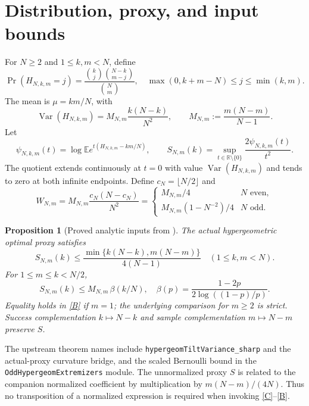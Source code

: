 \documentclass[11pt]{article}
\numberwithin{equation}{section}
\newtheorem{proposition}[theorem]{Proposition}
\theoremstyle{remark}\newtheorem{remark}[theorem]{Remark}
\newcommand{\E}{\mathbb E}
\newcommand{\Var}{\operatorname{Var}}
\begin{document}
\section{Distribution, proxy, and input bounds}
For $N\ge2$ and $1\le k,m<N$, define
\begin{equation}\label{pmf}
\Pr(H_{N,k,m}=j)=
 \frac{\binom{k}{j}\binom{N-k}{m-j}}{\binom{N}{m}},
 \quad \max(0,k+m-N)\le j\le\min(k,m).
\end{equation}
The mean is $\mu=km/N$, with
\begin{equation}\label{variance}
\Var(H_{N,k,m})=
M_{N,m}\frac{k(N-k)}{N^2},\qquad
M_{N,m}:=\frac{m(N-m)}{N-1}.
\end{equation}
Let
\begin{equation}\label{proxy}
\psi_{N,k,m}(t)=\log\E e^{t(H_{N,k,m}-km/N)},\qquad
S_{N,m}(k)=\sup_{t\in\mathbb R\setminus\{0\}}
 \frac{2\psi_{N,k,m}(t)}{t^2}.
\end{equation}
The quotient extends continuously at $t=0$ with value
$\Var(H_{N,k,m})$ and tends to zero at both infinite endpoints.
Define $c_N=\lfloor N/2\rfloor$ and
\begin{equation}\label{W}
W_{N,m}=M_{N,m}\frac{c_N(N-c_N)}{N^2}
=\begin{cases}M_{N,m}/4&N\text{ even},\\
 M_{N,m}(1-N^{-2})/4&N\text{ odd}.
\end{cases}
\end{equation}

\begin{proposition}[Proved analytic inputs from \cite{Wang}]\label{inputs}
The actual hypergeometric optimal proxy satisfies
\begin{equation}\label{C}
S_{N,m}(k)\le
\frac{\min\{k(N-k),m(N-m)\}}{4(N-1)}
\quad (1\le k,m<N).
\end{equation}
For $1\le m\le k<N/2$,
\begin{equation}\label{B}
S_{N,m}(k)\le M_{N,m}\,\beta(k/N),\quad
\beta(p)=\frac{1-2p}{2\log((1-p)/p)}.
\end{equation}
Equality holds in \eqref{B} if $m=1$; the underlying comparison
for $m\ge2$ is strict. Success complementation $k\mapsto N-k$
and sample complementation $m\mapsto N-m$ preserve $S$.
\end{proposition}
The upstream theorem names include
\texttt{hypergeomTiltVariance\_sharp} and the actual-proxy
curvature bridge, and the scaled Bernoulli bound in the
\texttt{OddHypergeomExtremizers} module. The unnormalized proxy $S$
is related to the companion normalized coefficient by multiplication
by $m(N-m)/(4N)$. Thus no transposition of a normalized expression
is required when invoking \eqref{C}--\eqref{B}.
\end{document}
